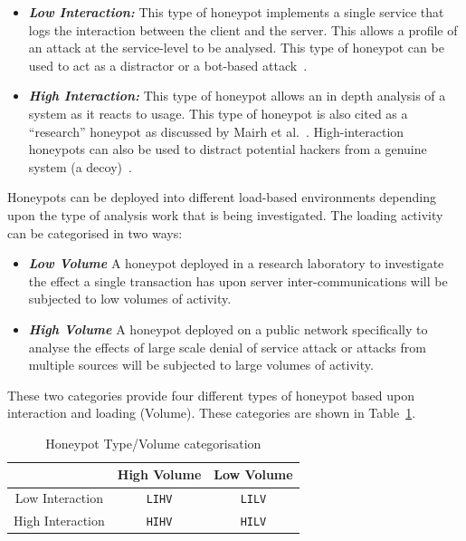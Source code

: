\begin{itemize}
\item \noindent \emph{\textbf{Low Interaction:}} This type of honeypot implements a single service that logs the interaction between the client and the server. This allows a profile of an attack at the service-level to be analysed. This type of honeypot can be used to act as a distractor or a bot-based attack~\cite{SZB:16}.
\newline
\item \noindent \emph{\textbf{High Interaction:}} This type of honeypot allows an in depth analysis of a system as it reacts to usage. This type of honeypot is also cited as a ``research'' honeypot as discussed by Mairh et al.~\cite{MBVJ:11}. High-interaction honeypots can also be used to distract potential hackers from a genuine system (a decoy)~\cite{M:06,SNKA:12}. 
\end{itemize}

Honeypots can be deployed into different load-based environments depending upon the type of analysis work that is being investigated. The loading activity can be categorised in two ways:
 
\begin{itemize}
\item \noindent \emph{\textbf{Low Volume}} A honeypot deployed in a research laboratory to investigate the effect a single transaction has upon server inter-communications will be subjected to low volumes of activity.
\item \noindent \emph{\textbf{High Volume}} A honeypot deployed on a public network specifically to analyse the effects of large scale denial of service attack or attacks from multiple sources will be subjected to large volumes of activity.
\end{itemize}
 
These two categories provide four different types of honeypot based upon interaction and loading (Volume). These categories are shown in Table~\ref{table:HoneypotTypes}.

\begin{table}[h]
\begin{center}
\begin{tabular}{ | c | c| c | } 
\hline
 & High Volume & Low Volume\\ 
\hline
Low Interaction & \texttt{LIHV} & \texttt{LILV} \\ 
\hline
High Interaction & \texttt{HIHV} & \texttt{HILV} \\ 
\hline
\end{tabular}
\end{center}
\caption{Honeypot Type/Volume categorisation}
\label{table:HoneypotTypes}
\end{table}

